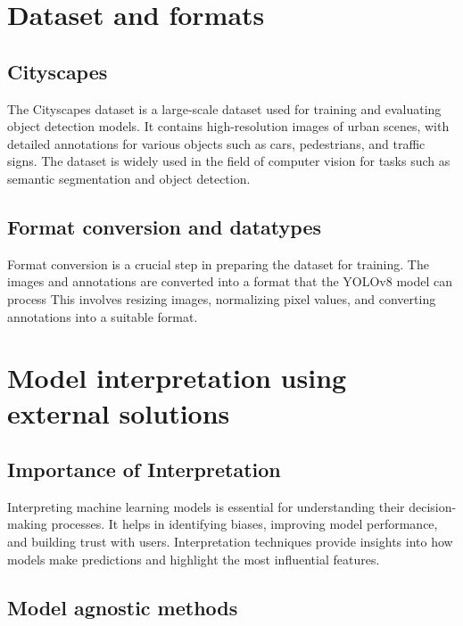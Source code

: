 \documentclass[11pt,a4paper,twoside,openright]{report}  %
\begin{document}
\section{Dataset and formats}\label{sec:dataset-and-formats}

\subsection{Cityscapes}\label{subsec:cityscapes}
The Cityscapes dataset is a large-scale dataset used for training and evaluating object detection models.
It contains high-resolution images of urban scenes, with detailed annotations for various objects such as cars,
pedestrians, and traffic signs.
The dataset is widely used in the field of computer vision for tasks such as semantic segmentation and object detection.

\subsection{Format conversion and datatypes}\label{subsec:formatconversion}
Format conversion is a crucial step in preparing the dataset for training.
The images and annotations are converted into a format that the YOLOv8 model can process
This involves resizing images, normalizing pixel values, and converting annotations into a suitable format.



\section{Model interpretation using external solutions}\label{sec:model-interpretation}

\subsection{Importance of Interpretation}\label{subsec:importance-of-interpretation}
Interpreting machine learning models is essential for understanding their decision-making processes.
It helps in identifying biases, improving model performance, and building trust with users.
Interpretation techniques provide insights into how models make predictions and highlight
the most influential features.
\subsection{Model agnostic methods}\label{subsec:model-agnostic-methods}
\end{document}
